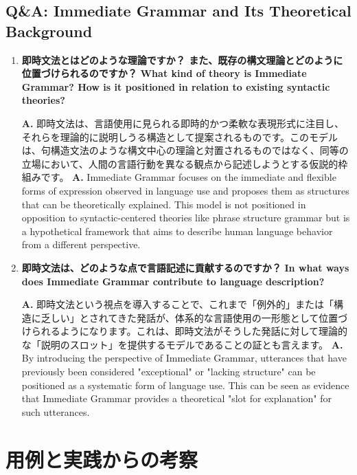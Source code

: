 \subsection{Q\&A: Immediate Grammar and Its Theoretical Background}
\fi

\begin{enumerate}[label=\textbf{Q\arabic*.}, leftmargin=2em]

  \item \label{qa:20250405a}
\ifJPN
  \textbf{即時文法とはどのような理論ですか？ また、既存の構文理論とどのように位置づけられるのですか？}
\else
  \textbf{What kind of theory is Immediate Grammar? How is it positioned in relation to existing syntactic theories?}
\fi

\ifJPN
  \textbf{A.} 即時文法は、言語使用に見られる即時的かつ柔軟な表現形式に注目し、それらを理論的に説明しうる構造として提案されるものです。このモデルは、句構造文法のような構文中心の理論と対置されるものではなく、同等の立場において、人間の言語行動を異なる観点から記述しようとする仮説的枠組みです。
\else
  \textbf{A.} Immediate Grammar focuses on the immediate and flexible forms of expression observed in language use and proposes them as structures that can be theoretically explained. This model is not positioned in opposition to syntactic-centered theories like phrase structure grammar but is a hypothetical framework that aims to describe human language behavior from a different perspective.
\fi

  \item \label{qa:20250405b}
\ifJPN
  \textbf{即時文法は、どのような点で言語記述に貢献するのですか？}
\else
  \textbf{In what ways does Immediate Grammar contribute to language description?}
\fi

\ifJPN
  \textbf{A.} 即時文法という視点を導入することで、これまで「例外的」または「構造に乏しい」とされてきた発話が、体系的な言語使用の一形態として位置づけられるようになります。これは、即時文法がそうした発話に対して理論的な「説明のスロット」を提供するモデルであることの証とも言えます。
\else
  \textbf{A.} By introducing the perspective of Immediate Grammar, utterances that have previously been considered "exceptional" or "lacking structure" can be positioned as a systematic form of language use. This can be seen as evidence that Immediate Grammar provides a theoretical "slot for explanation" for such utterances.
\fi

\end{enumerate}

\ifJPN
\section{用例と実践からの考察}
\else
